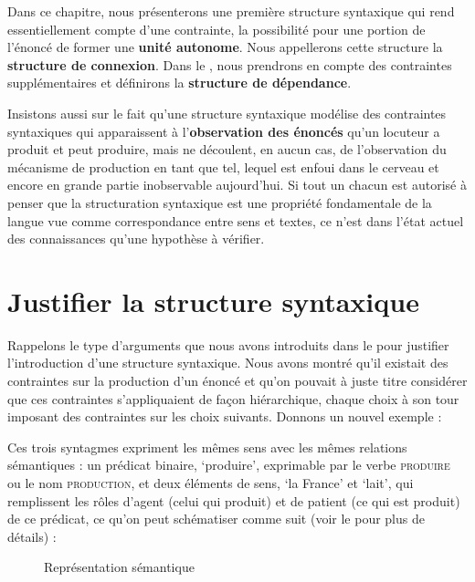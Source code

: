 Dans ce chapitre, nous présenterons une première structure syntaxique qui rend essentiellement compte d’une contrainte, la possibilité pour une portion de l’énoncé de former une \textbf{unité autonome}. Nous appellerons cette structure la \textbf{structure de connexion}. Dans le , nous prendrons en compte des contraintes supplémentaires et définirons la \textbf{structure de dépendance}.

Insistons aussi sur le fait qu’une structure syntaxique modélise des contraintes syntaxiques qui apparaissent à l’\textbf{observation des énoncés} qu’un locuteur a produit et peut produire, mais ne découlent, en aucun cas, de l’observation du mécanisme de production en tant que tel, lequel est enfoui dans le cerveau et encore en grande partie inobservable aujourd’hui. Si tout un chacun est autorisé à penser que la structuration syntaxique est une propriété fondamentale de la langue vue comme correspondance entre sens et textes, ce n’est dans l’état actuel des connaissances qu’une hypothèse à vérifier.

\section{Justifier la structure syntaxique}\label{sec:3.2.1}

Rappelons le type d’arguments que nous avons introduits dans le  pour justifier l’introduction d’une structure syntaxique. Nous avons montré qu’il existait des contraintes sur la production d’un énoncé et qu’on pouvait à juste titre considérer que ces contraintes s’appliquaient de façon hiérarchique, chaque choix à son tour imposant des contraintes sur les choix suivants. Donnons un nouvel exemple :

\z

\z

\z

Ces trois syntagmes expriment les mêmes sens avec les mêmes relations sémantiques : un prédicat binaire, ‘produire’, exprimable par le verbe \textsc{produire} ou le nom \textsc{production,} et deux éléments de sens, ‘la France’ et ‘lait’, qui remplissent les rôles d’agent (celui qui produit) et de patient (ce qui est produit) de ce prédicat, ce qu’on peut schématiser comme suit (voir le  pour plus de détails) :

\begin{figure}
\caption{\label{fig:}Représentation sémantique}
\end{figure}

